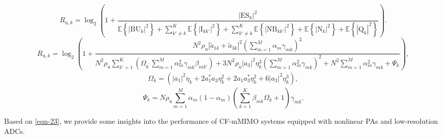 \documentclass[lettersize,journal]{IEEEtran}
\begin{document}
\begin{CJK}{UTF8}{gbsn}
\begin{figure}[ht]
	\centering
	\begin{equation}\label{eqn-22}
		{R_{\text{u},k}}= {\log _2}\left(1 + \frac{{{{\left| {{\text{ES}_k}} \right|}^2}}}{{\mathbb{E}\left \{\left |  \text{BU}_k \right | ^2 \right \}   +\sum \limits_{k'\ne k}^{K} \mathbb{E} \left \{ \left | \text{I}_{kk'} \right |^2  \right \}   +  \sum \limits_{k'\ne k}^{K}\mathbb{E}\left \{ \left |  {\text{NB}_{kk'}}  \right |^2  \right \}  +\mathbb{E} \left \{ \left | {\text{N}_k} \right |^2  \right \}   +  \mathbb{E}\left \{ \left |  \text{Q}_k\right | ^2 \right \}  } }\right).
	\end{equation}
	\hrulefill
	\begin{equation}\label{eqn-23}
		R_{\text{u}, k}=\log _{2}\left(1+\frac{N^{2} \rho_\text{u}\left|\tilde{a}_{1 k}+\tilde{a}_{3 k}\right|^{2}\left(\sum\limits_{m=1}^{M} \alpha_{m} \gamma_{m k}\right)^{2}}{N^{2} \rho_\text{u} \sum\limits_{k'=1}^{K}\left(\Omega_{k^{\prime}} \sum\limits_{m=1}^{M} \alpha_{m}^{2} \gamma_{m k} \beta_{m k'}\right)+3 N^{2} \rho_\text{u}\left|a_{3}\right|^{2} \eta_{k}^{3}\left(\sum\limits_{m=1}^{M} \alpha_{m}^{2} \gamma_{m k}\right)^{2}+N^{2} \sum\limits_{m=1}^{M} \alpha_{m}^{2} \gamma_{m k}+\Psi _k }\right),
	\end{equation}
	\begin{equation}\begin{aligned}\Omega _k = \left( {{{\left| {{a_1}} \right|}^2}{\eta _{k}} + 2a_1^*{a_3}{\eta _{k}^2}+ 2{a_1}a_3^ * \eta _{k}^2 + 6{{\left| {{a_3}} \right|}^2}\eta _{k}^3} \right), \end{aligned}\end{equation}
	\begin{equation}\Psi _k={N}{\rho _\text{u}}\mathop \sum \limits_{m = 1}^M {\alpha _m}(1 - {\alpha _m})\left( {\mathop \sum \limits_{k = 1}^K {\beta _{mk}}\Omega _k + 1} \right){\gamma _{mk}}.\end{equation}
	\hrulefill
\end{figure}

Based on \eqref{eqn-23}, we provide some insights into the performance of CF-mMIMO systems equipped with nonlinear PAs and low-resolution ADCs.


\end{CJK}
\end{document}
